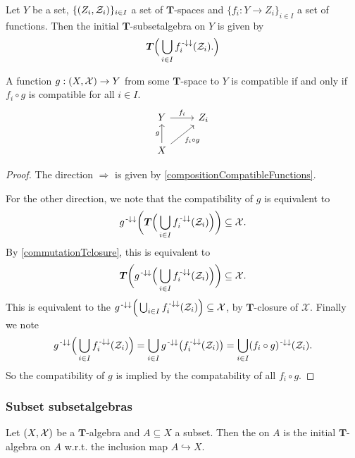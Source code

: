 \begin{proposition}
Let $Y$ be a set, $\{\sSet{Z_i,\mathcal{Z}_i}\}_{i\in I}$ a set of $\boldsymbol{T}$-spaces and $\{f_i: Y\to Z_i\}_{i\in I}$ a set of functions. Then the initial $\boldsymbol{T}$-subsetalgebra on $Y$ is given by
\[ \boldsymbol{T}\Big( \bigcup_{i\in I}f_i^{{\text{\hspace{0.15em}-}\downarrow}\downarrow}(\mathcal{Z}_i). \Big) \]
\end{proposition}
\begin{corollary}
A function $g: \sSet{X,\mathcal{X}}\to Y$ from some $\boldsymbol{T}$-space to $Y$ is compatible \textup{if and only if} $f_i\circ g$ is compatible for all $i\in I$.
\[ \begin{tikzcd}
Y \rar["f_i"] & Z_i \\
X \uar["g"] \arrow[ur, swap, "{f_i\circ g}"]
\end{tikzcd} \]
\end{corollary}
\begin{proof}
The direction $\Rightarrow$ is given by \ref{compositionCompatibleFunctions}.

For the other direction, we note that the compatibility of $g$ is equivalent to
\[ g^{{\text{\hspace{0.15em}-}\downarrow}\downarrow}\bigg(\boldsymbol{T}\Big(\bigcup_{i\in I}f_i^{{\text{\hspace{0.15em}-}\downarrow} \downarrow}(\mathcal{Z}_i)\Big)\bigg) \subseteq \mathcal{X}. \]
By \ref{commutationTclosure}, this is equivalent to
\[ \boldsymbol{T}\bigg(g^{{\text{\hspace{0.15em}-}\downarrow}\downarrow}\Big(\bigcup_{i\in I}f_i^{{\text{\hspace{0.15em}-}\downarrow} \downarrow}(\mathcal{Z}_i)\Big)\bigg) \subseteq \mathcal{X}. \]
This is equivalent to the $g^{{\text{\hspace{0.15em}-}\downarrow}\downarrow}\Big(\bigcup_{i\in I}f_i^{{\text{\hspace{0.15em}-}\downarrow} \downarrow}(\mathcal{Z}_i)\Big) \subseteq \mathcal{X}$, by $\boldsymbol{T}$-closure of $\mathcal{X}$. Finally we note
\[ g^{{\text{\hspace{0.15em}-}\downarrow}\downarrow}\Big(\bigcup_{i\in I}f_i^{{\text{\hspace{0.15em}-}\downarrow} \downarrow}(\mathcal{Z}_i)\Big) = \bigcup_{i\in I}g^{{\text{\hspace{0.15em}-}\downarrow}\downarrow}\big(f_i^{{\text{\hspace{0.15em}-}\downarrow} \downarrow}(\mathcal{Z}_i)\big) = \bigcup_{i\in I}(f_{i}\circ g)^{{\text{\hspace{0.15em}-}\downarrow}\downarrow}(\mathcal{Z}_i). \]
So the compatibility of $g$ is implied by  the compatability of all $f_i\circ g$.
\end{proof}

\subsubsection{Subset subsetalgebras}
\begin{definition}
Let $\sSet{X,\mathcal{X}}$ be a $\boldsymbol{T}$-algebra and $A\subseteq X$ a subset. Then the  on $A$ is the initial $\boldsymbol{T}$-algebra on $A$ w.r.t. the inclusion map $A\hookrightarrow X$.
\end{definition}

